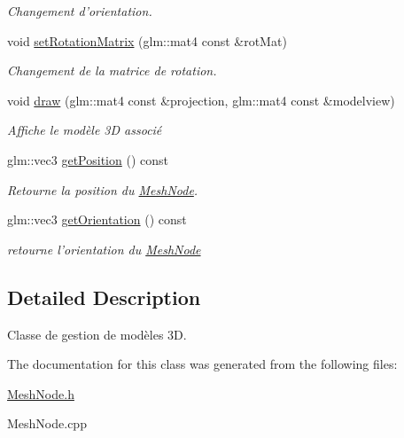 \begin{DoxyCompactItemize}
\begin{DoxyCompactList}\small\item\em Changement d'orientation. \end{DoxyCompactList}\item 
\hypertarget{classMeshNode_afead0fffba17459bbd07ffb2ff36cd6f}{void \hyperlink{classMeshNode_afead0fffba17459bbd07ffb2ff36cd6f}{set\+Rotation\+Matrix} (glm\+::mat4 const \&rot\+Mat)}\label{classMeshNode_afead0fffba17459bbd07ffb2ff36cd6f}

\begin{DoxyCompactList}\small\item\em Changement de la matrice de rotation. \end{DoxyCompactList}\item 
\hypertarget{classMeshNode_a7b395032fec02d7164791cee62429a37}{void \hyperlink{classMeshNode_a7b395032fec02d7164791cee62429a37}{draw} (glm\+::mat4 const \&projection, glm\+::mat4 const \&modelview)}\label{classMeshNode_a7b395032fec02d7164791cee62429a37}

\begin{DoxyCompactList}\small\item\em Affiche le modèle 3\+D associé \end{DoxyCompactList}\item 
\hypertarget{classMeshNode_a9f798b9773b027539a07d34db4861498}{glm\+::vec3 \hyperlink{classMeshNode_a9f798b9773b027539a07d34db4861498}{get\+Position} () const }\label{classMeshNode_a9f798b9773b027539a07d34db4861498}

\begin{DoxyCompactList}\small\item\em Retourne la position du \hyperlink{classMeshNode}{Mesh\+Node}. \end{DoxyCompactList}\item 
\hypertarget{classMeshNode_afddcbcd339487cf95e0b4078caedbd31}{glm\+::vec3 \hyperlink{classMeshNode_afddcbcd339487cf95e0b4078caedbd31}{get\+Orientation} () const }\label{classMeshNode_afddcbcd339487cf95e0b4078caedbd31}

\begin{DoxyCompactList}\small\item\em retourne l'orientation du \hyperlink{classMeshNode}{Mesh\+Node} \end{DoxyCompactList}\end{DoxyCompactItemize}


\subsection{Detailed Description}
Classe de gestion de modèles 3\+D. 

The documentation for this class was generated from the following files\+:\begin{DoxyCompactItemize}
\item 
\hyperlink{MeshNode_8h}{Mesh\+Node.\+h}\item 
Mesh\+Node.\+cpp\end{DoxyCompactItemize}
